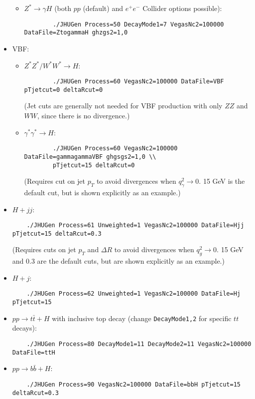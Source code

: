 \documentclass[aps,superscriptaddress,nofootinbib]{revtex4}
\begin{document}
\begin{itemize}
\begin{itemize}
		\item $Z^*\to\gamma H$ (both $pp$ (default) and $e^+e^-$ Collider options possible):
		\begin{verbatim}
		./JHUGen Process=50 DecayMode1=7 VegasNc2=100000 DataFile=ZtogammaH ghzgs2=1,0
		\end{verbatim}
	\end{itemize}
	\item VBF:
	\begin{itemize}
		\item $Z^*Z^*/W^*W^*\to H$:
		\begin{verbatim}
		./JHUGen Process=60 VegasNc2=100000 DataFile=VBF pTjetcut=0 deltaRcut=0
		\end{verbatim}
		(Jet cuts are generally not needed for VBF production with only $ZZ$ and $WW$, since there is no divergence.)
		\item $\gamma^*\gamma^*\to H$:
		\begin{verbatim}
		./JHUGen Process=60 VegasNc2=100000 DataFile=gammagammaVBF ghgsgs2=1,0 \\
		pTjetcut=15 deltaRcut=0
		\end{verbatim}
		(Requires cut on jet $p_T$ to avoid divergences when $q_\gamma^2\to 0$.  15 GeV is the default cut, but is shown explicitly as an example.)
	\end{itemize}
	\item $H+jj$:
	\begin{verbatim}
	./JHUGen Process=61 Unweighted=1 VegasNc2=100000 DataFile=Hjj pTjetcut=15 deltaRcut=0.3
	\end{verbatim}
	(Requires cuts on jet $p_T$ and $\Delta R$ to avoid divergences when $q_g^2\to 0$.  15 GeV and 0.3 are the default cuts, but are shown explicitly as an example.)
	\item $H+j$:
	\begin{verbatim}
	./JHUGen Process=62 Unweighted=1 VegasNc2=100000 DataFile=Hj pTjetcut=15
	\end{verbatim}
	\item $pp \to t\bar{t}+H$ with inclusive top decay (change \verb|DecayMode1,2| for specific $tt$ decays):
	\begin{verbatim}
	./JHUGen Process=80 DecayMode1=11 DecayMode2=11 VegasNc2=100000 DataFile=ttH
	\end{verbatim}
	\item $pp \to b\bar{b}+H$:
	\begin{verbatim}
	./JHUGen Process=90 VegasNc2=100000 DataFile=bbH pTjetcut=15 deltaRcut=0.3
	\end{verbatim}

\end{itemize}
\end{document}
